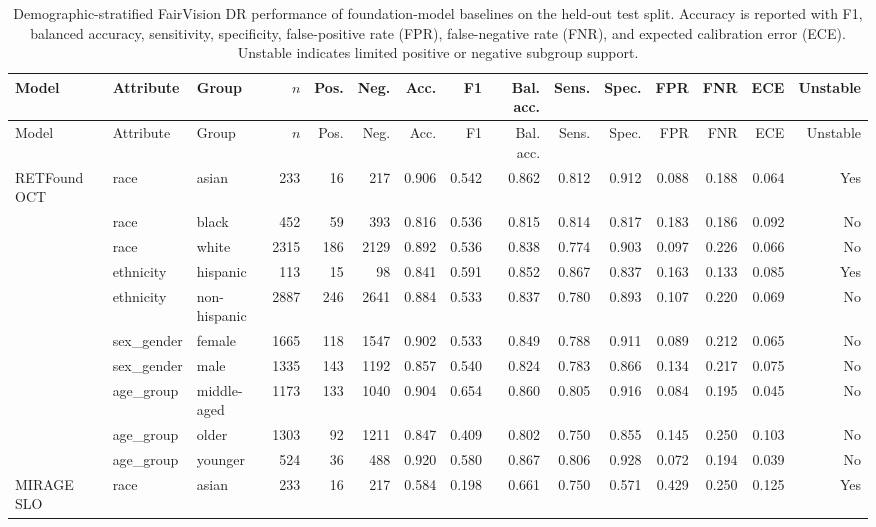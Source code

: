 \begingroup
\scriptsize
\setlength{\tabcolsep}{3pt}
\begin{longtable}{@{}lllrrrrrrrrrrrr@{}}
\caption{Demographic-stratified FairVision DR performance of foundation-model baselines on the held-out test split. Accuracy is reported with F1, balanced accuracy, sensitivity, specificity, false-positive rate (FPR), false-negative rate (FNR), and expected calibration error (ECE). Unstable indicates limited positive or negative subgroup support.}\label{tab:fairvision_foundation_demographic_dr}\\
\toprule
Model & Attribute & Group & $n$ & Pos. & Neg. & Acc. & F1 & Bal. acc. & Sens. & Spec. & FPR & FNR & ECE & Unstable \\
\midrule
\endfirsthead
\toprule
Model & Attribute & Group & $n$ & Pos. & Neg. & Acc. & F1 & Bal. acc. & Sens. & Spec. & FPR & FNR & ECE & Unstable \\
\midrule
\endhead
RETFound OCT & race & asian & 233 & 16 & 217 & 0.906 & 0.542 & 0.862 & 0.812 & 0.912 & 0.088 & 0.188 & 0.064 & Yes \\
 & race & black & 452 & 59 & 393 & 0.816 & 0.536 & 0.815 & 0.814 & 0.817 & 0.183 & 0.186 & 0.092 & No \\
 & race & white & 2315 & 186 & 2129 & 0.892 & 0.536 & 0.838 & 0.774 & 0.903 & 0.097 & 0.226 & 0.066 & No \\
 & ethnicity & hispanic & 113 & 15 & 98 & 0.841 & 0.591 & 0.852 & 0.867 & 0.837 & 0.163 & 0.133 & 0.085 & Yes \\
 & ethnicity & non-hispanic & 2887 & 246 & 2641 & 0.884 & 0.533 & 0.837 & 0.780 & 0.893 & 0.107 & 0.220 & 0.069 & No \\
 & sex\_gender & female & 1665 & 118 & 1547 & 0.902 & 0.533 & 0.849 & 0.788 & 0.911 & 0.089 & 0.212 & 0.065 & No \\
 & sex\_gender & male & 1335 & 143 & 1192 & 0.857 & 0.540 & 0.824 & 0.783 & 0.866 & 0.134 & 0.217 & 0.075 & No \\
 & age\_group & middle-aged & 1173 & 133 & 1040 & 0.904 & 0.654 & 0.860 & 0.805 & 0.916 & 0.084 & 0.195 & 0.045 & No \\
 & age\_group & older & 1303 & 92 & 1211 & 0.847 & 0.409 & 0.802 & 0.750 & 0.855 & 0.145 & 0.250 & 0.103 & No \\
 & age\_group & younger & 524 & 36 & 488 & 0.920 & 0.580 & 0.867 & 0.806 & 0.928 & 0.072 & 0.194 & 0.039 & No \\
MIRAGE SLO & race & asian & 233 & 16 & 217 & 0.584 & 0.198 & 0.661 & 0.750 & 0.571 & 0.429 & 0.250 & 0.125 & Yes \\

\end{longtable}
